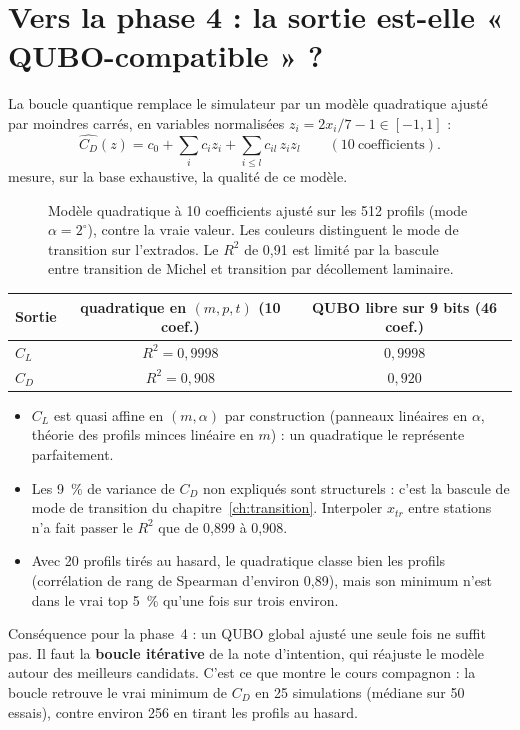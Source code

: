 \section{Vers la phase 4 : la sortie est-elle « QUBO-compatible » ?}
La boucle quantique remplace le simulateur par un modèle quadratique ajusté par moindres carrés, en variables normalisées $z_i=2x_i/7-1\in[-1,1]$ :
\[
\widehat{C_D}(z)=c_0+\sum_ic_iz_i+\sum_{i\le l}c_{il}\,z_iz_l\qquad(10\ \text{coefficients}).
\]
 mesure, sur la base exhaustive, la qualité de ce modèle.

\begin{figure}[htbp]
\centering

\caption{Modèle quadratique à 10 coefficients ajusté sur les 512 profils (mode $\alpha=2^\circ$), contre la vraie valeur. Les couleurs distinguent le mode de transition sur l'extrados. Le $R^2$ de 0,91 est limité par la bascule entre transition de Michel et transition par décollement laminaire.}\label{fig:quad}
\end{figure}

\begin{center}
\begin{tabular}{lcc}
\toprule
Sortie & quadratique en $(m,p,t)$ (10 coef.) & QUBO libre sur 9 bits (46 coef.) \\
\midrule
$C_L$ & $R^2=0{,}9998$ & $0{,}9998$ \\
$C_D$ & $R^2=0{,}908$ & $0{,}920$ \\
\bottomrule
\end{tabular}
\end{center}
\begin{itemize}
\item $C_L$ est quasi affine en $(m,\alpha)$ par construction (panneaux linéaires en $\alpha$, théorie des profils minces linéaire en $m$) : un quadratique le représente parfaitement.
\item Les 9~\% de variance de $C_D$ non expliqués sont structurels : c'est la bascule de mode de transition du chapitre~\ref{ch:transition}. Interpoler $x_{tr}$ entre stations n'a fait passer le $R^2$ que de 0,899 à 0,908.
\item Avec 20 profils tirés au hasard, le quadratique classe bien les profils (corrélation de rang de Spearman d'environ 0,89), mais son minimum n'est dans le vrai top 5~\% qu'une fois sur trois environ.
\end{itemize}

\begin{projet}
Conséquence pour la phase~4 : un QUBO global ajusté une seule fois ne suffit pas. Il faut la \textbf{boucle itérative} de la note d'intention, qui réajuste le modèle autour des meilleurs candidats. C'est ce que montre le cours compagnon : la boucle retrouve le vrai minimum de $C_D$ en 25 simulations (médiane sur 50 essais), contre environ 256 en tirant les profils au hasard.
\end{projet}


